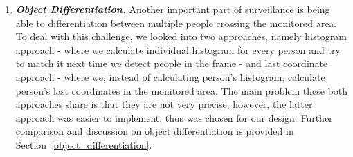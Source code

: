 \begin{enumerate}
\item \textit{\textbf{Object Differentiation.}} Another important part of surveillance is being able to differentiation between multiple people crossing the monitored area. To deal with this challenge, we looked into two approaches, namely histogram approach - where we calculate individual histogram for every person and try to match it next time we detect people in the frame - and last coordinate approach - where we, instead of calculating person's histogram, calculate person's last coordinates in the monitored area. The main problem these both approaches share is that they are not very precise, however, the latter approach was easier to implement, thus was chosen for our design. Further comparison and discussion on object differentiation is provided in Section~\ref{object_differentiation}.
\end{enumerate}